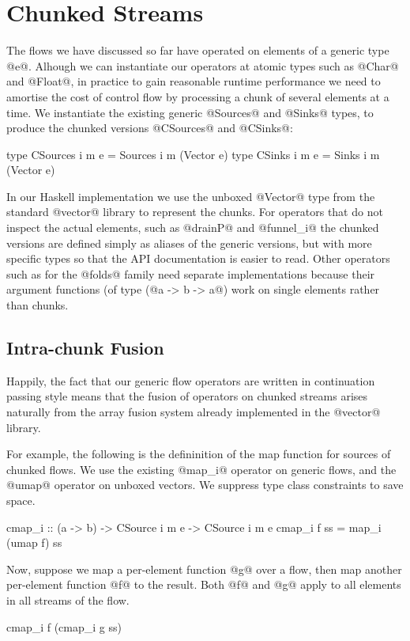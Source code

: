 \section{Chunked Streams}
\label{s:Chunked}
The flows we have discussed so far have operated on elements of a generic type @e@. Alhough we can instantiate our operators at atomic types such as @Char@ and @Float@, in practice to gain reasonable runtime performance we need to amortise the cost of control flow by processing a chunk of several elements at a time. We instantiate the existing generic @Sources@ and @Sinks@ types, to produce the chunked versions @CSources@ and @CSinks@:
\begin{code}
   type CSources i m e = Sources i m (Vector e)
   type CSinks   i m e = Sinks   i m (Vector e)
\end{code}

In our Haskell implementation we use the unboxed @Vector@ type from the standard @vector@ library to represent the chunks. For operators that do not inspect the actual elements, such as @drainP@ and @funnel_i@ the chunked versions are defined simply as aliases of the generic versions, but with more specific types so that the API documentation is easier to read. Other operators such as for the @folds@ family need separate implementations because their argument functions (of type (@a -> b -> a@) work on single elements rather than chunks. 


\subsection{Intra-chunk Fusion}
Happily, the fact that our generic flow operators are written in continuation passing style means that the fusion of operators on chunked streams arises naturally from the array fusion system already implemented in the @vector@ library.

For example, the following is the defininition of the map function for sources of chunked flows. We use the existing @map_i@ operator on generic flows, and the @umap@ operator on unboxed vectors. We suppress type class constraints to save space.
\begin{code}
   cmap_i :: (a -> b) 
          -> CSource i m e -> CSource i m e
   cmap_i f ss = map_i (umap f) ss
\end{code}

Now, suppose we map a per-element function @g@ over a flow, then map another per-element function @f@ to the result. Both @f@ and @g@ apply to all elements in all streams of the flow.
\begin{code}
   cmap_i f (cmap_i g ss)
\end{code}

